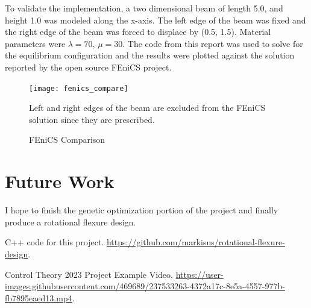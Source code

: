\documentclass[11pt,letterpaper]{article}
\begin{document}
To validate the implementation, a two dimensional beam of length 5.0, and height 1.0 was modeled along the x-axis. The left edge of the beam was fixed and the right edge of the beam was forced to displace by (0.5, 1.5). Material parameters were $\lambda = 70$, $\mu = 30$. The code from this report was used to solve for the equilibrium configuration and the results were plotted against the solution reported by the open source FEniCS project.


\begin{figure}[H]
\begin{center}
\texttt{[image: fenics\_compare]}
\caption{FEniCS Comparison}
\label{fenics-compare}

Left and right edges of the beam are excluded from the FEniCS solution since they are prescribed.

\end{center}
\end{figure}

\section{Future Work}
I hope to finish the genetic optimization portion of the project and finally produce a rotational flexure design.


\begin{thebibliography}{9}

  C++ code for this project. \url{https://github.com/markisus/rotational-flexure-design}.

Control Theory 2023 Project Example Video. \url{https://user-images.githubusercontent.com/469689/237533263-4372a17c-8e5a-4557-977b-fb7895eaed13.mp4}.
\end{thebibliography}
\end{document}
